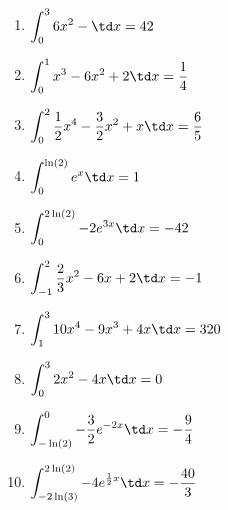 \begin{Answer}[ref=integralRechnA2]\\
	\begin{enumerate}[label=\alph*)]
		\item \(\displaystyle\int_{0}^{3} 6x^2- \td x=42\)
		\item \(\displaystyle\int_{0}^{1} x^3-6x^2+2 \td x=\frac{1}{4}\)
		\item \(\displaystyle\int_{0}^{2} \frac{1}{2}x^4-\frac{3}{2}x^2+x \td x=\frac{6}{5}\)
		\item \(\displaystyle\int_{0}^{\ln(2)} e^x \td x=1\)
		\item \(\displaystyle\int_{0}^{2\ln(2)} -2e^{3x} \td x=-42\)
		\item \(\displaystyle\int_{-1}^{2} \frac{2}{3}x^2-6x+2 \td x=-1\)
		\item \(\displaystyle\int_{1}^{3} 10x^4-9x^3+4x \td x=320\)
		\item \(\displaystyle\int_{0}^{3} 2x^2-4x \td x=0\)
		\item \(\displaystyle\int_{-\ln(2)}^{0} -\frac{3}{2}e^{-2x} \td x=-\frac{9}{4}\)
		\item \(\displaystyle\int_{-2\ln(3)}^{2\ln(2)} -4e^{\frac{1}{2}x} \td x=-\frac{40}{3}\)
	\end{enumerate}
\end{Answer}